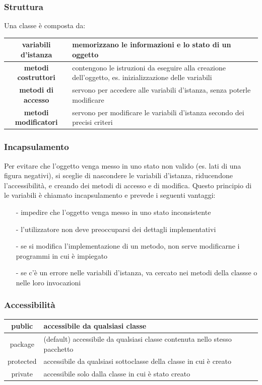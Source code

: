 \documentclass{article}
\begin{document}
\subsubsection*{Struttura}
Una classe è composta da:
\begin{center}
	\begin{tabularx}{\textwidth}{c X}
		\textbf{variabili d'istanza} & memorizzano le informazioni e lo stato di un oggetto \\
		\midrule
		\textbf{metodi costruttori} & contengono le istruzioni da eseguire alla creazione dell'oggetto, es. inizializzazione delle variabili \\
		\midrule
		\textbf{metodi di accesso} & servono per accedere alle variabili d'istanza, senza poterle modificare \\
		\midrule
		\textbf{metodi modificatori} & servono per modificare le variabili d'istanza secondo dei precisi criteri
	\end{tabularx}
\end{center}

\subsubsection*{Incapsulamento}
Per evitare che l'oggetto venga messo in uno stato non valido (es. lati di una figura negativi), si sceglie di nascondere le variabili
d'istanza, riducendone l'accessibilità, e creando dei metodi di accesso e di modifica. Questo principio di  le variabili è chiamato incapsulamento e prevede i seguenti vantaggi:
\begin{itemize}[topsep=3pt, itemsep=0pt]
	\item[-] impedire che l'oggetto venga messo in uno stato inconsistente
	\item[-] l'utilizzatore non deve preoccuparsi dei dettagli implementativi
	\item[-] se si modifica l'implementazione di un metodo, non serve modificarne i programmi in cui è impiegato
	\item[-] se c'è un errore nelle variabili d'istanza, va cercato nei metodi della classse o nelle loro invocazioni
\end{itemize}

\subsubsection*{Accessibilità}
\begin{center}
	\begin{tabularx}{\textwidth}{c X}
		public & accessibile da qualsiasi classe \\
		\midrule
		package & (default) accessibile da qualsiasi classe contenuta nello stesso pacchetto \\
		\midrule
		protected & accessibile da qualsiasi sottoclasse della classe in cui è creato \\
		\midrule
		private & accessibile solo dalla classe in cui è stato creato
	\end{tabularx}
\end{center}
\end{document}
